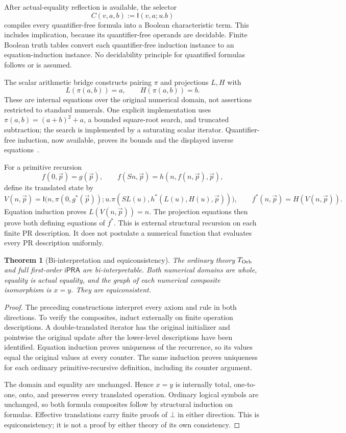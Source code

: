\documentclass[11pt]{article}
\newtheorem{theorem}{Theorem}[section]
\theoremstyle{definition}
\newcommand{\ipra}{\mathsf{iPRA}}
\newcommand{\Tor}{T_{\rm Orb}}
\newcommand{\I}{\mathsf I}
\begin{document}
After actual-equality reflection is available, the selector
\[
 C(v,a,b):=\I(v,a;u.b)
\]
compiles every quantifier-free formula into a Boolean characteristic term. This includes implication, because its quantifier-free operands are decidable. Finite Boolean truth tables convert each quantifier-free induction instance to an equation-induction instance. No decidability principle for quantified formulas follows or is assumed.

The scalar arithmetic bridge constructs pairing $\pi$ and projections $L,H$ with
\[
 L(\pi(a,b))=a,\qquad H(\pi(a,b))=b.
\]
These are internal equations over the original numerical domain, not assertions restricted to standard numerals. One explicit implementation uses
$\pi(a,b)=(a+b)^2+a$, a bounded square-root search, and truncated subtraction; the search is implemented by a saturating scalar iterator. Quantifier-free induction, now available, proves its bounds and the displayed inverse equations~\cite{bridge}.

For a primitive recursion
\[
 f(0,\vec p)=g(\vec p),\qquad
 f(Sn,\vec p)=h(n,f(n,\vec p),\vec p),
\]
define its translated state by
\[
 V(n,\vec p)=\I\bigl(n,\pi(0,g^*(\vec p));
       u.\pi(SL(u),h^*(L(u),H(u),\vec p))\bigr),
 \qquad f^*(n,\vec p)=H(V(n,\vec p)).
\]
Equation induction proves $L(V(n,\vec p))=n$. The projection equations then prove both defining equations of $f^*$. This is external structural recursion on each finite PR description. It does not postulate a numerical function that evaluates every PR description uniformly.

\begin{theorem}[Bi-interpretation and equiconsistency]
The ordinary theory $\Tor$ and full first-order $\ipra$ are bi-interpretable. Both numerical domains are whole, equality is actual equality, and the graph of each numerical composite isomorphism is $x=y$. They are equiconsistent.
\end{theorem}
\begin{proof}
The preceding constructions interpret every axiom and rule in both directions. To verify the composites, induct externally on finite operation descriptions. A double-translated iterator has the original initializer and pointwise the original update after the lower-level descriptions have been identified. Equation induction proves uniqueness of the recurrence, so its values equal the original values at every counter. The same induction proves uniqueness for each ordinary primitive-recursive definition, including its counter argument.

The domain and equality are unchanged. Hence $x=y$ is internally total, one-to-one, onto, and preserves every translated operation. Ordinary logical symbols are unchanged, so both formula composites follow by structural induction on formulas. Effective translations carry finite proofs of $\bot$ in either direction. This is equiconsistency; it is not a proof by either theory of its own consistency.
\end{proof}
\end{document}
